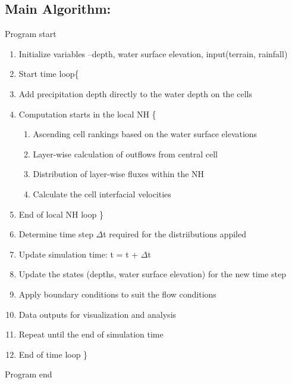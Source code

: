 \subsection*{Main Algorithm:}
Program start
\begin{enumerate}
	\item Initialize variables –depth, water surface elevation, input(terrain, rainfall)
	\item Start time loop\{
	\item Add precipitation depth directly to the water depth on the cells
	\item Computation starts in the local NH \{
	\begin{enumerate}
		\item Ascending cell rankings based on the water surface elevations
		\item Layer-wise calculation of outflows from central cell
		\item Distribution of layer-wise fluxes within the NH
		\item Calculate the cell interfacial velocities
	\end{enumerate}
	\item End of local NH loop \}
	\item Determine time step $\Delta$t required for the distriibutions appiled
	\item Update simulation time: t = t + $\Delta$t
	\item Update the states (depths, water surface elevation) for the new time step
	\item Apply boundary conditions to suit the flow conditions
	\item Data outputs for visualization and analysis
	\item Repeat until the end of simulation time
	\item End of time loop \}
\end{enumerate}
Program end

